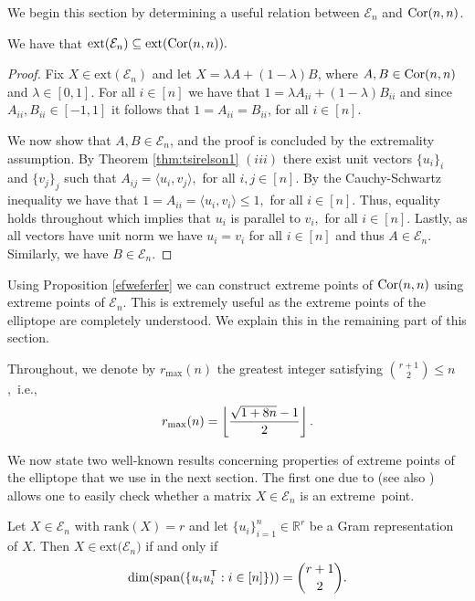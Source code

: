 \documentclass{siamart}
\begin{document}
{We begin this {section} by determining  a useful relation
between ${\mathcal{E}}_n$ and ${\rm Cor}(n,n)$.

\medskip 
\begin{proposition}\label{efweferfer}
{We have that ${{\mathrm{ext}} ({\mathcal{E}}_n) \subseteq {\mathrm{ext}} ({\rm Cor}(n,n))}.$}
\end{proposition}

\begin{proof}
Fix $X\in {\mathrm{ext}} ({\mathcal{E}}_n)$ and let $X=\lambda A+(1-\lambda)B$, where $A,B\in {\rm Cor}(n,n)$ and $\lambda\in [0,1]$. For all $i\in [n]$ we have that $1=\lambda A_{ii}+(1-\lambda)B_{ii}$  and since  $A_{ii},B_{ii}\in [-1,1]$ it follows that
$1=A_{ii}=B_{ii}$, for all $i\in [n].$

We now show that  $A,B\in {\mathcal{E}}_n$, and the proof is concluded by the extremality assumption.  By Theorem \ref{thm:tsirelson1} $(iii)$
  there exist unit vectors $\{u_i\}_i$ and $\{v_j\}_j$ such that $A_{ij}={\langle} u_i,v_j{\rangle},$ for all $i,j\in [n]$. By the Cauchy-Schwartz inequality we have that
$1=A_{ii}={\langle} u_i,v_i{\rangle} \le 1, $ for all $i\in [n]$.  Thus, equality holds throughout which implies that $u_i$ is parallel to $v_i,$ for all $i\in[n]$. Lastly, as all vectors have unit norm  we have   $u_i=v_i$ for all $i\in [n]$ {and thus $A\in {\mathcal{E}}_n$}. Similarly, we have $B\in {\mathcal{E}}_n$.
\end{proof}
\medskip

Using  Proposition  \ref{efweferfer} we can construct extreme points
of ${\rm Cor}(n,n)$ using extreme points of ${\mathcal{E}}_n$. This is
extremely  useful as the extreme points of the elliptope are
completely understood.  We explain this in the remaining part of
this section.

Throughout, we denote by   $r_{\max}(n)$  the {greatest} integer
satisfying $\binom{r+1}{2}\le n$,~i.e.,
$$r_{\max}(n)=\left\lfloor {\sqrt{1+8n}-1 \over 2}\right\rfloor.$$

We now state two well-known results concerning properties of extreme
points of the elliptope that we use in the next section.   The first
one due to  \cite{LT94} (see also \cite[Corollary 31.5.4]{DL})
allows {one} to easily check whether a matrix $X\in {\mathcal{E}}_n$   is
{an extreme~point}.

\medskip
\begin{theorem} [{\cite{LT94}}] \label{thm:perturbationsdimension}
Let $X\in {\mathcal{E}}_n$  with ${\mathrm{rank}}(X)= r$ and let   $\{u_i\}_{i=1}^n\in {\mathbb{R}}^r$  be a Gram representation of $X$.
Then $X\in {\mathrm{ext}} {({\mathcal{E}}_n})$ if and only if
$$\dim ( {\mathrm{span}}( { \{ u_iu_i^{{\sf T}}: i\in [n] \}}))=\binom{r+1}{2}.$$
\end{theorem}
\medskip

}
\end{document}
